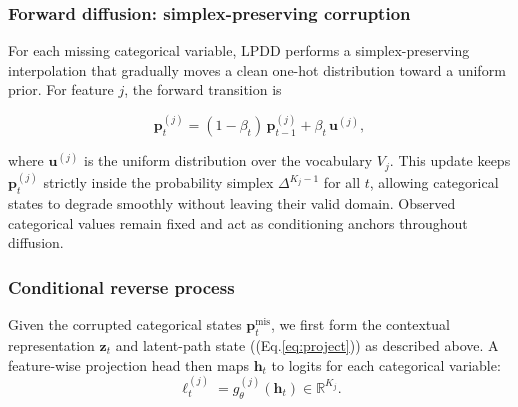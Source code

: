 \documentclass[times, review, 10pt]{elsarticle}
\begin{document}





\subsubsection{Forward diffusion: simplex-preserving corruption}

For each missing categorical variable, LPDD performs a simplex-preserving
interpolation that gradually moves a clean one-hot distribution toward a
uniform prior. For feature $j$, the forward transition is

\[
\mathbf{p}_{t}^{(j)}
= (1-\beta_t)\,\mathbf{p}_{t-1}^{(j)} + \beta_t\,\mathbf{u}^{(j)},
\]

where $\mathbf{u}^{(j)}$ is the uniform distribution over the vocabulary
$V_j$. This update keeps $\mathbf{p}_{t}^{(j)}$ strictly inside the
probability simplex $\Delta^{K_j-1}$ for all $t$, allowing categorical states
to degrade smoothly without leaving their valid domain. Observed categorical
values remain fixed and act as conditioning anchors throughout diffusion.


\subsubsection{Conditional reverse process}

Given the corrupted categorical states $\mathbf{p}_t^{\mathrm{mis}}$, we first
form the contextual representation $\mathbf{z}_t$ and latent-path state
((Eq.\ref{eq:project})) as described
above. A feature-wise projection head then maps $\mathbf{h}_t$ to logits for
each categorical variable:
\begin{equation}
\boldsymbol{\ell}_t^{(j)} = g_\theta^{(j)}(\mathbf{h}_t)
\in \mathbb{R}^{K_j}.
\label{eq:project10}
\end{equation}
\end{document}
